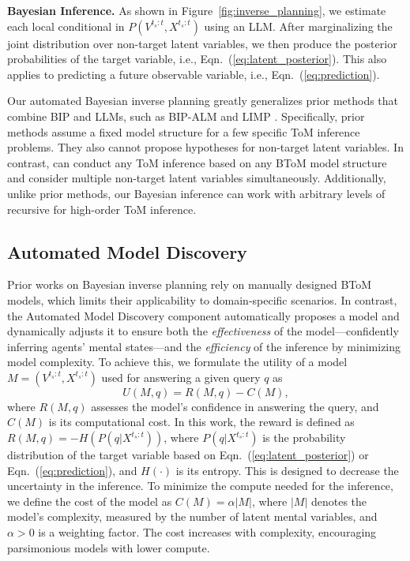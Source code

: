 \textbf{Bayesian Inference.} As shown in Figure~\ref{fig:inverse_planning}, we estimate each local conditional in $P(V^{t_s:t}, X^{t_s:t})$ using an LLM. After marginalizing the joint distribution over non-target latent variables, we then produce the posterior probabilities of the target variable, i.e., Eqn.~(\ref{eq:latent_posterior}). This also applies to predicting a future observable variable, i.e., Eqn.~(\ref{eq:prediction}). 

Our automated Bayesian inverse planning greatly generalizes prior methods that combine BIP and LLMs, such as BIP-ALM \cite{jin2024mmtom} and LIMP \cite{shi2024muma}. Specifically, prior methods assume a fixed model structure for a few specific ToM inference problems. They also cannot propose hypotheses for non-target latent variables. In contrast, \ours can conduct any ToM inference based on any BToM model structure and consider multiple non-target latent variables simultaneously. Additionally, unlike prior methods, our Bayesian inference can work with arbitrary levels of recursive for high-order ToM inference.


\subsection{Automated Model Discovery}
\label{sec:model_discovery}


Prior works on Bayesian inverse planning rely on manually designed BToM models, which limits their applicability to domain-specific scenarios. In contrast, the Automated Model Discovery component automatically proposes a model and dynamically adjusts it to ensure both the \textit{effectiveness} of the model—confidently inferring agents' mental states—and the \textit{efficiency} of the inference by minimizing model complexity. To achieve this, we formulate the utility of a model $M = (V^{t_s:t}, X^{t_s:t})$ used for answering a given query $q$ as 
\begin{equation}
    U(M, q) = R(M, q) - C(M),
\end{equation}
where $R(M, q)$ assesses the model's confidence in answering the query, and $C(M)$ is its computational cost. In this work, the reward is defined as $R(M, q) = -H(P(q | X^{t_s:t}))$, where $P(q | X^{t_s:t})$ is the probability distribution of the target variable based on Eqn.~(\ref{eq:latent_posterior}) or Eqn.~(\ref{eq:prediction}), and $H(\cdot)$ is its entropy. This is designed to decrease the uncertainty in the inference. To minimize the compute needed for the inference, we define the cost of the model as  $C(M) = \alpha |M|$, where $|M|$ denotes the model's complexity, measured by the number of latent mental variables, and $\alpha > 0$ is a weighting factor. The cost increases with complexity, encouraging parsimonious models with lower compute.

